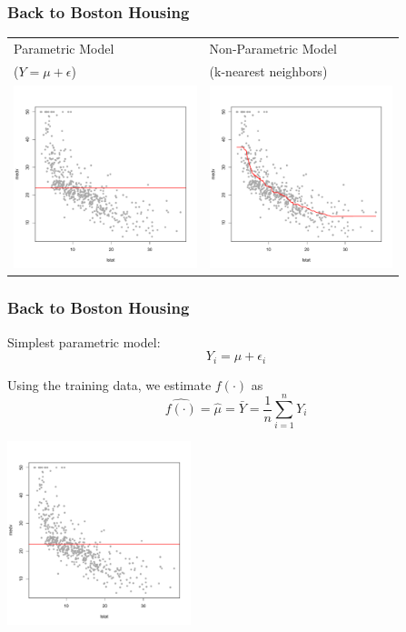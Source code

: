 \documentclass[flegn]{beamer}
\newcommand{\sko}{\vspace{.1in}}
\begin{document}
\begin{frame}
\frametitle{Back to Boston Housing}
\begin{tabular}{ll}
Parametric Model  & Non-Parametric Model   \\
 ($Y=\mu+\epsilon$)&(k-nearest neighbors)\\
\includegraphics[width=2.1in]{Boston2}&\includegraphics[width=2.1in]{Boston4}
\end{tabular}
\end{frame}

\begin{frame}
\frametitle{Back to Boston Housing}
Simplest parametric model:
$$
Y_i  = \mu + \epsilon_i
$$

\sko

\begin{minipage}{2.3in}
Using the training data, we estimate $f(\cdot)$ as
$$
\widehat{f(\cdot)} = \hat{\mu} = \bar{Y} = \frac{1}{n}\sum_{i=1}^n Y_i
$$
\end{minipage}
\begin{minipage}{1.65in}
\begin{center}
\includegraphics[width=2.1in]{Boston2}
\end{center}
\end{minipage}
\end{frame}
\end{document}
